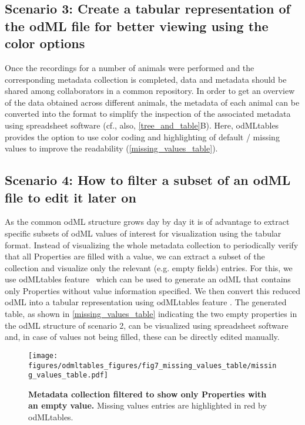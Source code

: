\subsection*{Scenario 3: Create a tabular representation of the odML file for better viewing using the color options}
Once the recordings for a number of animals were performed and the corresponding metadata collection is completed, data and metadata should be shared among collaborators in a common repository. In order to get an overview of the data obtained across different animals, the metadata of each animal can be converted into the  format to simplify the inspection of the associated metadata using spreadsheet software (cf., also, \cref{tree_and_table}B). Here, odMLtables provides the option to use color coding and highlighting of default / missing values to improve the readability (\cref{missing_values_table}).

\subsection*{Scenario 4: How to filter a subset of an odML file to edit it later on}
As the common odML structure grows day by day it is of advantage to extract specific subsets of odML values of interest for visualization using the tabular format. Instead of visualizing the whole metadata collection to periodically verify that all Properties are filled with a value, we can extract a subset of the collection and visualize only the relevant (e.g. empty fields) entries. For this, we use odMLtables feature \ffilter\ which can be used to generate an odML that contains only Properties without value information specified. We then convert this reduced odML into a tabular  representation using odMLtables feature \fconvert. The generated table, as shown in \cref{missing_values_table} indicating the two empty properties in the odML structure of scenario 2, can be visualized using spreadsheet software and, in case of values not being filled, these can be directly edited manually.

\begin{figure}[h!]
\begin{center}
\texttt{[image: figures/odmltables\_figures/fig7\_missing\_values\_table/missing\_values\_table.pdf]}
\caption{\label{fig:missing_values_table}
\textbf{Metadata collection filtered to show only Properties with an empty value.} Missing values entries are highlighted in red by odMLtables.}
\end{center}
\end{figure}

